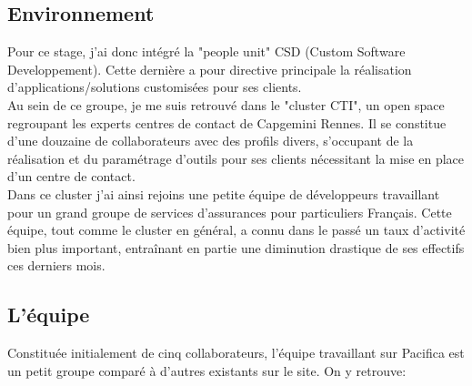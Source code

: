 \documentclass{rapport}
\begin{document}
\subsection{Environnement}

Pour ce stage, j'ai donc intégré la "people unit" CSD (Custom Software Developpement). Cette dernière a pour directive principale la réalisation d'applications/solutions customisées pour ses clients.\\

Au sein de ce groupe, je me suis retrouvé dans le "cluster CTI", un open space regroupant les experts centres de contact de Capgemini Rennes. Il se constitue d'une douzaine de collaborateurs avec des profils divers, s'occupant de la réalisation et du paramétrage d'outils pour ses clients nécessitant la mise en place d'un centre de contact.\\

Dans ce cluster j'ai ainsi rejoins une petite équipe de développeurs travaillant pour un grand groupe de services d’assurances pour particuliers Français. Cette équipe, tout comme le cluster en général, a connu dans le passé un taux d'activité bien plus important, entraînant en partie une diminution drastique de ses effectifs ces derniers mois.

\subsection{L'équipe}

Constituée initialement de cinq collaborateurs, l'équipe travaillant sur Pacifica est un petit groupe comparé à d'autres existants sur le site.
On y retrouve:\\
\end{document}
